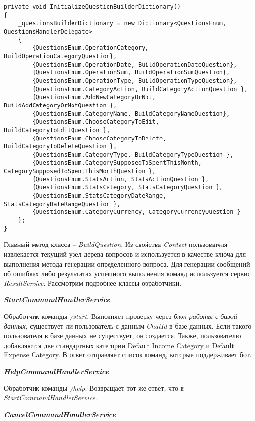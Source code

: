 \lstset{style=sharpc}
\begin{lstlisting}
private void InitializeQuestionBuilderDictionary()
{
	_questionsBuilderDictionary = new Dictionary<QuestionsEnum, QuestionsHandlerDelegate>
	{
		{QuestionsEnum.OperationCategory, BuildOperationCategoryQuestion},
		{QuestionsEnum.OperationDate, BuildOperationDateQuestion},
		{QuestionsEnum.OperationSum, BuildOperationSumQuestion},
		{QuestionsEnum.OperationType, BuildOperationTypeQuestion},
		{QuestionsEnum.CategoryAction, BuildCategoryActionQuestion },
		{QuestionsEnum.AddNewCategoryOrNot, BuildAddCategoryOrNotQuestion },
		{QuestionsEnum.CategoryName, BuildCategoryNameQuestion},
		{QuestionsEnum.ChooseCategoryToEdit, BuildCategoryToEditQuestion },
		{QuestionsEnum.ChooseCategoryToDelete, BuildCategoryToDeleteQuestion },
		{QuestionsEnum.CategoryType, BuildCategoryTypeQuestion },
		{QuestionsEnum.CategorySupposedToSpentThisMonth, CategorySupposedToSpentThisMonthQuestion },
		{QuestionsEnum.StatsAction, StatsActionQuestion },
		{QuestionsEnum.StatsCategory, StatsCategoryQuestion },
		{QuestionsEnum.StatsCategoryDateRange, StatsCategoryDateRangeQuestion },
		{QuestionsEnum.CategoryCurrency, CategoryCurrencyQuestion }
	};
}
\end{lstlisting}

Главный метод класса – \emph{BuildQuestion}. Из свойства \emph{Context} пользователя извлекается текущий узел дерева вопросов и используется в качестве ключа для выполнения метода генерации определенного вопроса.
Для генерации сообщений об ошибках либо результатах успешного выполнения команд используется сервис \emph{ResultService}.
Рассмотрим подробнее классы-обработчики.

\textbf{\emph{StartCommandHandlerService}}

Обработчик команды \emph{/start}. Выполняет проверку через \emph{блок работы с базой данных}, существует ли пользователь с данным \emph{ChatId} в базе данных. Если такого пользователя в базе данных не существует, он создается. Также, пользователю добавляются две стандартных категории Default Income Category и Default Expense Category. В ответ отправляет список команд, которые поддерживает бот.

\textbf{\emph{HelpCommandHandlerService}}

Обработчик команды \emph{/help}. Возвращает тот же ответ, что и \linebreak \emph{StartCommandHandlerService}.

\textbf{\emph{CancelCommandHandlerService}}

